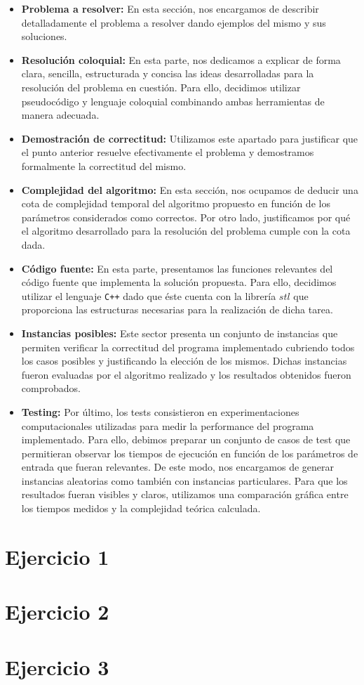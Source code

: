 \documentclass[10pt, a4paper]{article}
\begin{document}
\begin{itemize}
\item \textbf{Problema a resolver:} En esta sección, nos encargamos de describir detalladamente el problema a resolver dando ejemplos del mismo y sus soluciones.
\item \textbf{Resolución coloquial:} En esta parte, nos dedicamos a explicar de forma clara, sencilla, estructurada y concisa las ideas desarrolladas para la resolución del problema en cuestión. Para ello, decidimos utilizar pseudocódigo y lenguaje coloquial combinando ambas herramientas de manera adecuada.
\item \textbf{Demostración de correctitud:} Utilizamos este apartado para justificar que el punto anterior resuelve efectivamente el problema y demostramos formalmente la correctitud del mismo.
\item \textbf{Complejidad del algoritmo:} En esta sección, nos ocupamos de deducir una cota de complejidad temporal del algoritmo propuesto en función de los parámetros considerados como correctos. Por otro lado, justificamos por qué el algoritmo desarrollado para la resolución del problema cumple con la cota dada.
\item \textbf{Código fuente:} En esta parte, presentamos las funciones relevantes del código fuente que implementa la solución propuesta. Para ello, decidimos utilizar el lenguaje \verb*#C++# dado que éste cuenta con la librería $stl$ que proporciona las estructuras necesarias para la realización de dicha tarea.
\item \textbf{Instancias posibles:} Este sector presenta un conjunto de instancias que permiten verificar la correctitud del programa implementado cubriendo todos los casos posibles y justificando la elección de los mismos. Dichas instancias fueron evaluadas por el algoritmo realizado y los resultados obtenidos fueron comprobados.
\item \textbf{Testing:} Por último, los tests consistieron en experimentaciones computacionales utilizadas para medir la performance del programa implementado. Para ello, debimos preparar un conjunto de casos de test que permitieran observar los tiempos de ejecución en función de los parámetros de entrada que fueran relevantes. De este modo, nos encargamos de generar instancias aleatorias como también con instancias particulares. Para que los resultados fueran visibles y claros, utilizamos una comparación gráfica entre los tiempos medidos y la complejidad teórica calculada.
\end{itemize}
\newpage

\section{Ejercicio 1}

\newpage

\section{Ejercicio 2}

\newpage

\section{Ejercicio 3}

\newpage
\end{document}
